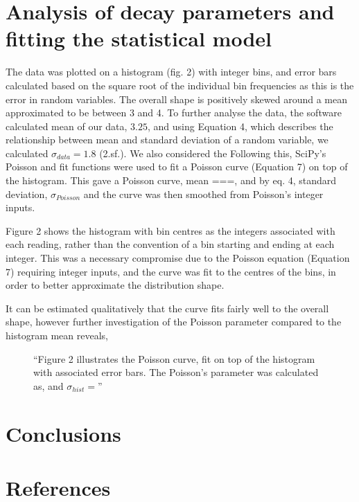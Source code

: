 \documentclass[11pt]{article}
\begin{document}
    \section{Analysis of decay parameters and fitting the statistical model}
    The data was plotted on a histogram (fig. 2) with integer bins, and error bars calculated based on the square root of the individual bin frequencies as this is the error in random variables.  The overall shape is positively skewed around a mean approximated to be between 3 and 4.
    \newline
    To further analyse the data, the software calculated mean of our data, $3.25$, and using Equation 4, which describes the relationship between mean and standard deviation of a random variable, we calculated  $\sigma_{data} = 1.8$  (2.sf.).  We also considered the  Following this, SciPy's Poisson and fit functions were used to fit a Poisson curve (Equation 7) on top of the histogram. This gave a Poisson curve, mean ===, and by eq. 4, standard deviation, $\sigma_{Poisson}$ and the curve was then smoothed from Poisson's integer inputs. 

    Figure 2 shows the histogram with bin centres as the integers associated with each reading, rather than the convention of a bin starting and ending at each integer. This was a necessary compromise due to the Poisson equation (Equation 7) requiring integer inputs, and the curve was fit to the centres of the bins, in order to better approximate the distribution shape. 
    
    It can be estimated qualitatively that the curve fits fairly well to the overall shape, however further investigation of the Poisson parameter compared to the histogram mean reveals, 
       \begin{figure}[]
        \begin{center}
            \def\svgwidth{\columnwidth}
            
             \caption{“Figure 2 illustrates the Poisson curve, fit on top of the histogram with associated error bars. The Poisson's parameter was calculated as, and $\sigma_{hist} = $”}
             \label{fig:experimental results 1}
        \end{center}
    \end{figure}
    \section{Conclusions}
    \section{References}
\end{document}
